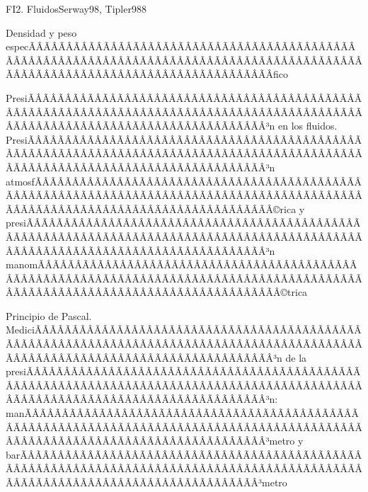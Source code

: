 \begin{sumilla}
\begin{unit}{FI2. Fluidos}{Serway98, Tipler98}{8}
\begin{topicos}
         \item  Densidad y peso especÃÂÃÂÃÂÃÂÃÂÃÂÃÂÃÂÃÂÃÂÃÂÃÂÃÂÃÂÃÂÃÂÃÂÃÂÃÂÃÂÃÂÃÂÃÂÃÂÃÂÃÂÃÂÃÂÃÂÃÂÃÂÃÂÃÂÃÂÃÂÃÂÃÂÃÂÃÂÃÂÃÂÃÂÃÂÃÂÃÂÃÂÃÂÃÂÃÂÃÂÃÂÃÂÃÂÃÂÃÂÃÂÃÂÃÂÃÂÃÂÃÂÃÂÃÂÃÂ­fico
	 \item  PresiÃÂÃÂÃÂÃÂÃÂÃÂÃÂÃÂÃÂÃÂÃÂÃÂÃÂÃÂÃÂÃÂÃÂÃÂÃÂÃÂÃÂÃÂÃÂÃÂÃÂÃÂÃÂÃÂÃÂÃÂÃÂÃÂÃÂÃÂÃÂÃÂÃÂÃÂÃÂÃÂÃÂÃÂÃÂÃÂÃÂÃÂÃÂÃÂÃÂÃÂÃÂÃÂÃÂÃÂÃÂÃÂÃÂÃÂÃÂÃÂÃÂÃÂÃÂÃÂ³n en los fluidos. PresiÃÂÃÂÃÂÃÂÃÂÃÂÃÂÃÂÃÂÃÂÃÂÃÂÃÂÃÂÃÂÃÂÃÂÃÂÃÂÃÂÃÂÃÂÃÂÃÂÃÂÃÂÃÂÃÂÃÂÃÂÃÂÃÂÃÂÃÂÃÂÃÂÃÂÃÂÃÂÃÂÃÂÃÂÃÂÃÂÃÂÃÂÃÂÃÂÃÂÃÂÃÂÃÂÃÂÃÂÃÂÃÂÃÂÃÂÃÂÃÂÃÂÃÂÃÂÃÂ³n atmosfÃÂÃÂÃÂÃÂÃÂÃÂÃÂÃÂÃÂÃÂÃÂÃÂÃÂÃÂÃÂÃÂÃÂÃÂÃÂÃÂÃÂÃÂÃÂÃÂÃÂÃÂÃÂÃÂÃÂÃÂÃÂÃÂÃÂÃÂÃÂÃÂÃÂÃÂÃÂÃÂÃÂÃÂÃÂÃÂÃÂÃÂÃÂÃÂÃÂÃÂÃÂÃÂÃÂÃÂÃÂÃÂÃÂÃÂÃÂÃÂÃÂÃÂÃÂÃÂ©rica y presiÃÂÃÂÃÂÃÂÃÂÃÂÃÂÃÂÃÂÃÂÃÂÃÂÃÂÃÂÃÂÃÂÃÂÃÂÃÂÃÂÃÂÃÂÃÂÃÂÃÂÃÂÃÂÃÂÃÂÃÂÃÂÃÂÃÂÃÂÃÂÃÂÃÂÃÂÃÂÃÂÃÂÃÂÃÂÃÂÃÂÃÂÃÂÃÂÃÂÃÂÃÂÃÂÃÂÃÂÃÂÃÂÃÂÃÂÃÂÃÂÃÂÃÂÃÂÃÂ³n manomÃÂÃÂÃÂÃÂÃÂÃÂÃÂÃÂÃÂÃÂÃÂÃÂÃÂÃÂÃÂÃÂÃÂÃÂÃÂÃÂÃÂÃÂÃÂÃÂÃÂÃÂÃÂÃÂÃÂÃÂÃÂÃÂÃÂÃÂÃÂÃÂÃÂÃÂÃÂÃÂÃÂÃÂÃÂÃÂÃÂÃÂÃÂÃÂÃÂÃÂÃÂÃÂÃÂÃÂÃÂÃÂÃÂÃÂÃÂÃÂÃÂÃÂÃÂÃÂ©trica
         \item  Principio de Pascal. MediciÃÂÃÂÃÂÃÂÃÂÃÂÃÂÃÂÃÂÃÂÃÂÃÂÃÂÃÂÃÂÃÂÃÂÃÂÃÂÃÂÃÂÃÂÃÂÃÂÃÂÃÂÃÂÃÂÃÂÃÂÃÂÃÂÃÂÃÂÃÂÃÂÃÂÃÂÃÂÃÂÃÂÃÂÃÂÃÂÃÂÃÂÃÂÃÂÃÂÃÂÃÂÃÂÃÂÃÂÃÂÃÂÃÂÃÂÃÂÃÂÃÂÃÂÃÂÃÂ³n de la presiÃÂÃÂÃÂÃÂÃÂÃÂÃÂÃÂÃÂÃÂÃÂÃÂÃÂÃÂÃÂÃÂÃÂÃÂÃÂÃÂÃÂÃÂÃÂÃÂÃÂÃÂÃÂÃÂÃÂÃÂÃÂÃÂÃÂÃÂÃÂÃÂÃÂÃÂÃÂÃÂÃÂÃÂÃÂÃÂÃÂÃÂÃÂÃÂÃÂÃÂÃÂÃÂÃÂÃÂÃÂÃÂÃÂÃÂÃÂÃÂÃÂÃÂÃÂÃÂ³n: manÃÂÃÂÃÂÃÂÃÂÃÂÃÂÃÂÃÂÃÂÃÂÃÂÃÂÃÂÃÂÃÂÃÂÃÂÃÂÃÂÃÂÃÂÃÂÃÂÃÂÃÂÃÂÃÂÃÂÃÂÃÂÃÂÃÂÃÂÃÂÃÂÃÂÃÂÃÂÃÂÃÂÃÂÃÂÃÂÃÂÃÂÃÂÃÂÃÂÃÂÃÂÃÂÃÂÃÂÃÂÃÂÃÂÃÂÃÂÃÂÃÂÃÂÃÂÃÂ³metro y barÃÂÃÂÃÂÃÂÃÂÃÂÃÂÃÂÃÂÃÂÃÂÃÂÃÂÃÂÃÂÃÂÃÂÃÂÃÂÃÂÃÂÃÂÃÂÃÂÃÂÃÂÃÂÃÂÃÂÃÂÃÂÃÂÃÂÃÂÃÂÃÂÃÂÃÂÃÂÃÂÃÂÃÂÃÂÃÂÃÂÃÂÃÂÃÂÃÂÃÂÃÂÃÂÃÂÃÂÃÂÃÂÃÂÃÂÃÂÃÂÃÂÃÂÃÂÃÂ³metro

\end{topicos}
\end{unit}
\end{sumilla}
